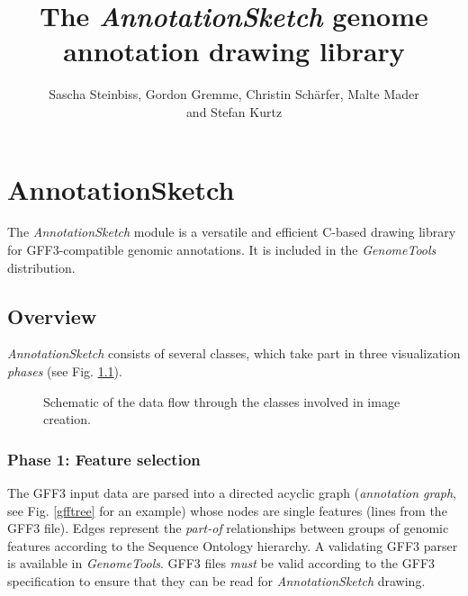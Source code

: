 \documentclass[a4paper]{scrreprt}
\title{The \emph{AnnotationSketch} genome annotation drawing library}
\author{Sascha Steinbiss, Gordon Gremme, Christin Sch\"arfer, Malte Mader\\ and Stefan Kurtz}
\begin{document}
\maketitle

\tableofcontents

\chapter{AnnotationSketch}

The \emph{AnnotationSketch} module is a versatile and efficient C-based drawing library for GFF3-compatible genomic annotations. It is included in the \emph{GenomeTools} distribution.

\section{Overview}
\emph{AnnotationSketch} consists of several classes, which take part in
three visualization \emph{phases} (see Fig. \ref{dataflow}).

\begin{figure}[ht]
\caption{Schematic of the data flow through the classes involved in image creation.}
\label{dataflow}
\end{figure}

\subsection{Phase 1: Feature selection}
The GFF3 input data are parsed into a directed acyclic graph (\emph{annotation graph}, see Fig. \ref{gfftree} for an example) whose nodes are single features (lines from the GFF3 file). Edges represent the \emph{part-of} relationships between
groups of genomic features according to the
Sequence Ontology hierarchy. A validating GFF3 parser is available in \emph{GenomeTools}. GFF3 files \emph{must} be valid according to the GFF3 specification to ensure that they can be read for \emph{AnnotationSketch} drawing.
\end{document}
